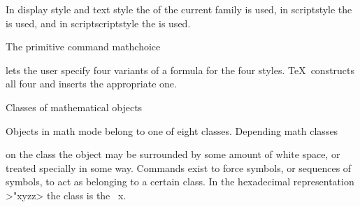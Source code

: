 In display style and text style the  of the
current family is used, 
in scriptstyle the  is used, and in
\alt
scriptscriptstyle the  is used.

The primitive command
\csterm mathchoice\par
\disp{}\rb
\dispstop
lets the user specify four variants of a formula for the
four styles. 
\TeX\ constructs all four and inserts the appropriate one.

 Classes of mathematical objects

Objects in math mode belong to one of eight classes. Depending
\term math classes\par
on the class the object may be surrounded by
some amount of white space,
or treated specially in some way. Commands exist to force
symbols, or sequences of symbols, to act as
belonging to a certain class.
In the hexadecimal representation \ver>"xyzz>
the class is the ~\n x.

